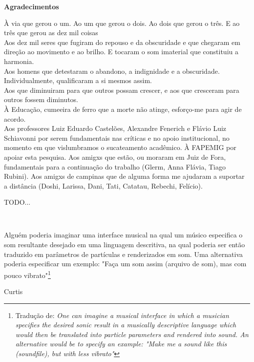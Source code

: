 \documentclass[
	12pt,				%
	openright,			%
	twoside,			%
	a4paper,			%
	english,			%
	french,				%
	spanish,			%
        italian,                        %
	brazil				%
	]{abntex2}
\begin{document}
\begin{flushright}
\large{\textbf{Agradecimentos}}

\small{À via que gerou o um. Ao um que gerou o dois. Ao dois que gerou o três. E ao três que gerou as dez mil coisas \\

Aos dez mil seres que fugiram do repouso e da obscuridade e que chegaram em direção ao movimento e ao brilho. E tocaram o som imaterial que constituiu a harmonia. \\

Aos homens que detestaram o abandono, a indignidade e a obscuridade. Individualmente, qualificaram a si mesmos assim.\\

Aos que diminuiram para que outros possam crescer, e aos que cresceram para outros fossem diminutos. \\

À Educação, cumeeira de ferro que a morte não atinge, esforço-me para agir de acordo. \\

Aos professores Luiz Eduardo Castelões, Alexandre Fenerich e Flávio Luiz Schiavonni por serem fundamentais nas críticas e no apoio institucional, no momento em que vislumbramos o sucateamento acadêmico. À FAPEMIG por apoiar esta pesquisa. Aos amigxs que estão, ou moraram em Juiz de Fora, fundamentais para a continuação do trabalho (Glerm, Anna Flávia, Tiago Rubini). Aos amigxs de campinas que de alguma forma me ajudaram a suportar a distância (Doshi, Larissa, Dani, Tati, Catatau, Rebechi, Felício).}

TODO...

\end{flushright}

\vfil \ 

\newpage


\epigraph{Alguém poderia imaginar uma interface musical na qual um músico especifica o som resultante desejado em uma linguagem descritiva, na qual poderia ser então traduzido em parâmetros de partículas e renderizados em som. Uma alternativa poderia especificar um exemplo: "Faça um som assim (arquivo de som), mas com pouco vibrato"\footnote{Tradução de: \emph{One can imagine a musical interface in which a musician specifies the desired sonic result in a musically descriptive language which would then be translated into particle parameters and rendered into sound. An alternative would be to specify an example: "Make me a sound like this (soundfile), but with less vibrato"}}}{Curtis }
\newpage
\end{document}
